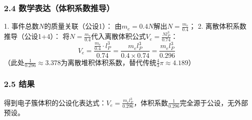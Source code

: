 \documentclass{article}
\begin{document}
\subsubsection{2.4 数学表达（体积系数推导）}
1. 事件总数\(N\)的质量关联（公设1）：  
   由\(m_e = 0.4N\)解出\(N = \frac{m_e}{0.4}\)；
2. 离散体积系数推导（公设1+4）：  
   将\(N = \frac{m_e}{0.4}\)代入离散体积公式\(V_e = \frac{N l_P^3}{0.74}\)：  
   \[
   V_e = \frac{\frac{m_e}{0.4} \cdot l_P^3}{0.74} = \frac{m_e l_P^3}{0.4 \times 0.74} = \frac{m_e l_P^3}{0.296}
   \]
   （此处\(\frac{1}{0.296}≈3.378\)为离散堆积体积系数，替代传统\(\frac{4}{3}\pi≈4.189\)）

\subsubsection{2.5 结果}
得到电子簇体积的公设化表达式：\(V_e = \frac{m_e l_P^3}{0.296}\)，体积系数\(\frac{1}{0.296}\)完全源于公设，无外部预设。
\end{document}
